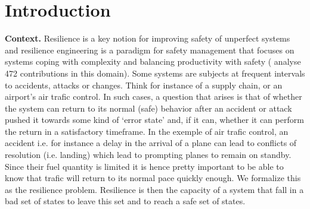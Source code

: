 \section{Introduction}\label{section introduction}


{\bf Context.} 
Resilience is a key notion for improving safety of unperfect systems and resilience engineering is a paradigm for safety management that focuses on systems coping with complexity and balancing productivity with safety (\cite{challenges} analyse 472 contributions in this domain). Some systems are subjects at frequent intervals to accidents, attacks or changes. Think for instance of a supply chain, or an airport’s air trafic control. In such cases, a question that arises is that of whether the system can return to its normal (safe) behavior after an accident or attack
pushed it towards some kind of ‘error state’ and, if it can, whether it can perform the return in a satisfactory timeframe. In the exemple of air trafic control, an accident i.e. for instance a delay in the arrival of a plane can lead to conflicts of resolution (i.e. landing) which lead to prompting planes to remain on standby. Since their fuel quantity is limited it is hence pretty important to be able to know that trafic will return to its normal pace quickly enough. We formalize this as the resilience problem. 
Resilience is then the capacity of a system that fall in a bad set of states to leave this set and to reach a safe set of states. \\

%



